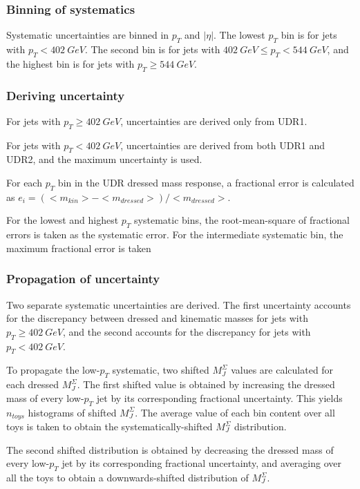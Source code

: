 \subsubsection{Binning of systematics}
Systematic uncertainties are binned in $p_{T}$ and $|\eta|$. The lowest
$p_{T}$ bin is for jets with $p_{T} < 402~GeV$. The second bin is for
jets with $402~GeV \leq p_T
< 544~GeV$, and the highest bin is for jets with $p_T \geq 544~GeV$.

\subsubsection{Deriving uncertainty}
For jets with $p_{T} \geq 402~GeV$, uncertainties are derived only
from UDR1.

For jets with $p_{T} < 402~GeV$, uncertainties are derived from both
UDR1 and UDR2, and the maximum uncertainty is used.

For each $p_T$ bin in the UDR dressed mass response, a fractional
error is calculated as
$e_i=\left(<m_{kin}>-<m_{dressed}>\right)/<m_{dressed}>$.

For the lowest and highest $p_T$ systematic bins, the root-mean-square
of fractional errors is taken as the systematic error. For the
intermediate systematic bin, the maximum fractional error is taken

\subsubsection{Propagation of uncertainty}
Two separate systematic uncertainties are derived. The first
uncertainty accounts for the discrepancy between dressed and kinematic
masses for jets with $p_T \geq 402~GeV$, and the second accounts for the
discrepancy for jets with $p_T < 402~GeV$.

To propagate the low-$p_T$ systematic, two shifted $M_{J}^{\Sigma}$
values are calculated for each dressed $M_{J}^{\Sigma}$. The first
shifted value is obtained by increasing the dressed mass of every
low-$p_T$ jet by its corresponding fractional uncertainty. This yields
$n_{toys}$ histograms of shifted $M_{J}^{\Sigma}$. The average value
of each bin content over all toys is taken to obtain the
systematically-shifted $M_{J}^{\Sigma}$ distribution. 

The second
shifted distribution is obtained by decreasing the dressed mass of every
low-$p_T$ jet by its corresponding fractional uncertainty, and
averaging over all the toys to obtain a downwards-shifted distribution
of $M_{J}^{\Sigma}$. 

